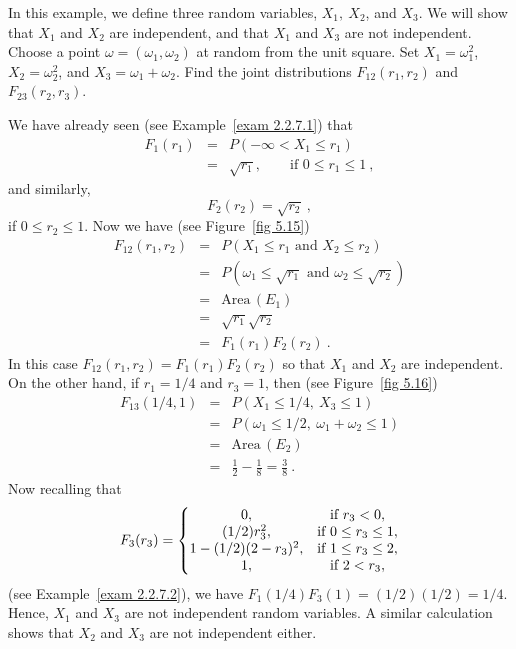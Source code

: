 \begin{example}
In this example, we define three random variables, $X_1,\ X_2$, and $X_3$.  We will show that
$X_1$ and $X_2$ are independent, and that $X_1$ and $X_3$ are not independent.  Choose a point
$\omega = (\omega_1,\omega_2)$ at random from the unit square.  Set $X_1 =
\omega_1^2$, $X_2 = \omega_2^2$, and $X_3 =
\omega_1 + \omega_2$.  Find the joint distributions $F_{12}(r_1,r_2)$ and $F_{23}(r_2,r_3)$.

We have already seen (see Example~\ref{exam 2.2.7.1}) that
\begin{eqnarray*}
 F_1(r_1) & = & P(-\infty < X_1 \leq r_1) \\
         & = & \sqrt{r_1}, \qquad \mbox{if} \,\,0 \leq r_1 \leq 1\ ,
\end{eqnarray*}
and similarly,
$$ F_2(r_2) = \sqrt{r_2}\ ,$$
if $0 \leq r_2 \leq 1$.
Now we have (see Figure~\ref{fig 5.15})
\begin{eqnarray*}
 F_{12}(r_1,r_2) & = & P(X_1 \leq r_1 \,\, \mbox{and}\,\, X_2 \leq r_2) \\
                & = & P(\omega_1 \leq \sqrt{r_1} \,\,\mbox{and}\,\, \omega_2 \leq
\sqrt{r_2}) \\
                & = & \mbox{Area}\,(E_1)\\
                & = & \sqrt{r_1} \sqrt{r_2} \\
                & = &F_1(r_1)F_2(r_2)\ .
\end{eqnarray*}
In this case $F_{12}(r_1,r_2) = F_1(r_1)F_2(r_2)$ so that $X_1$ and $X_2$ are
independent.  On the other hand, if $r_1 = 1/4$ and $r_3 = 1$, then (see Figure~\ref{fig
5.16})
\begin{eqnarray*}
F_{13}(1/4,1) & = & P(X_1 \leq 1/4,\ X_3 \leq 1) \\
              & = & P(\omega_1 \leq 1/2,\ \omega_1 + \omega_2 \leq 1) \\
              & = & \mbox{Area}\,(E_2) \\
              & = & \frac 12 - \frac 18 = \frac 38\ .
\end{eqnarray*}
Now recalling that
$$F_3(r_3) = \left \{ \begin{matrix}
                  0, & \mbox{if} \,\,r_3 < 0, \cr
         (1/2)r_3^2, & \mbox{if} \,\,0 \leq r_3 \leq 1, \cr
   1-(1/2)(2-r_3)^2, & \mbox{if} \,\,1 \leq r_3 \leq 2, \cr
                  1, & \mbox{if} \,\,2 < r_3,\cr\end{matrix}\right.
$$ (see Example~\ref{exam 2.2.7.2}), we have $F_1(1/4)F_3(1) = (1/2)(1/2) = 1/4$.  Hence, $X_1$
and $X_3$ are not independent random variables.  A similar calculation shows that $X_2$ and
$X_3$ are not independent either.
\end{example}

